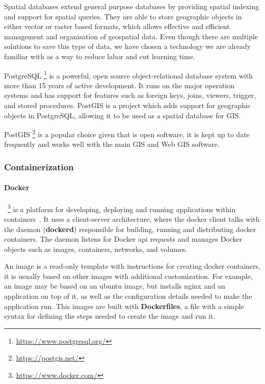 
Spatial databases extend general purpose databases by providing spatial indexing and support for spatial queries. They are able to store geographic objects in either vector or raster based formats, which allows effective and efficient management and organisation of geospatial data. Even though there are multiple solutions to save this type of data, we have chosen a technology we are already familiar with as a way to reduce labor and cut learning time.

PostgreSQL \footnote{\url{https://www.postgresql.org/}} is a powerful, open source object-relational database system with more than 15 years of active development. It runs on the major operation systems and has support for features such as foreign keys, joins, viewers, trigger, and stored procedures. PostGIS is a project which adds support for geographic objects in PostgreSQL, allowing it to be used as a spatial database for GIS. 

PostGIS \footnote{\url{https://postgis.net/}} is a popular choice given that is open software, it is kept up to date frequently and works well with the main GIS and Web GIS software.




\subsubsection{Containerization}
\label{sss:containerization}

\paragraph{\textbf{Docker}}~\footnote{\url{https://www.docker.com/}} is a platform for developing, deploying and running applications within containers~\cite{docker-overview}. It uses a client-server architecture, where the docker client talks with the daemon (\textbf{dockerd}) responsible for building, running and distributing docker containers. The daemon listens for Docker \acrshort{api} requests and manages Docker objects such as images, containers, networks, and volumes. 

An image is a read-only template with instructions for creating docker containers, it is usually based on other images with additional customization. For example, an image may be based on an ubuntu image, but installs nginx and an application on top of it, as well as the configuration details needed to make the application run. This images are built with \textbf{Dockerfiles}, a file with a simple syntax for defining the steps needed to create the image and run it. 

